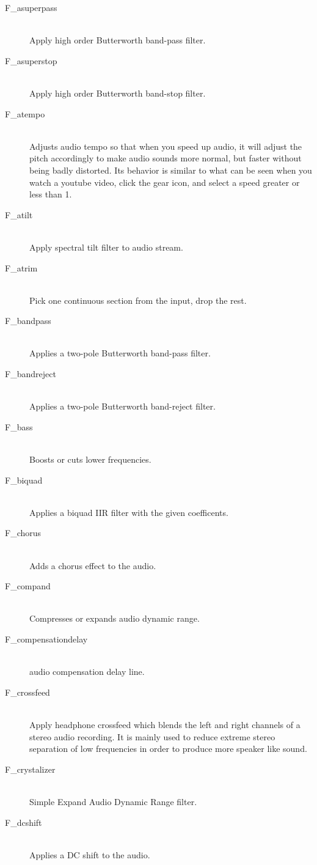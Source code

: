 \begin{description}
\item [F\_asuperpass]~\\Apply high order Butterworth band-pass filter.
\item [F\_asuperstop]~\\Apply high order Butterworth band-stop filter.
\item [F\_atempo]~\\Adjusts audio tempo so that when you speed up audio, it will adjust the pitch accordingly to make audio sounds more normal, but faster without being badly distorted. Its behavior is similar to what can be seen when you watch a youtube video, click the gear icon, and select a speed greater or less than 1.
\item [F\_atilt]~\\Apply spectral tilt filter to audio stream.
\item [F\_atrim]~\\Pick one continuous section from the input,
  drop the rest.
\item [F\_bandpass]~\\Applies a two-pole Butterworth band-pass
  filter.
\item [F\_bandreject]~\\Applies a two-pole Butterworth
  band-reject filter.
\item [F\_bass]~\\Boosts or cuts lower frequencies.
\item [F\_biquad]~\\Applies a biquad IIR filter with the given
  coefficents.
\item [F\_chorus]~\\Adds a chorus effect to the audio.
\item [F\_compand]~\\Compresses or expands audio dynamic
  range.
\item [F\_compensationdelay]~\\audio compensation delay line.
\item [F\_crossfeed]~\\Apply headphone crossfeed which blends
  the left and right channels of a stereo audio recording. It is
  mainly used to reduce extreme stereo separation of low frequencies
  in order to produce more speaker like sound.
\item [F\_crystalizer]~\\Simple Expand Audio Dynamic Range
  filter.
\item [F\_dcshift]~\\Applies a DC shift to the audio.

\end{description}
